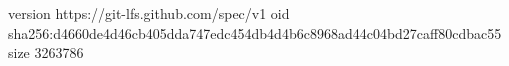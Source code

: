 version https://git-lfs.github.com/spec/v1
oid sha256:d4660de4d46cb405dda747edc454db4d4b6c8968ad44c04bd27caff80cdbac55
size 3263786
